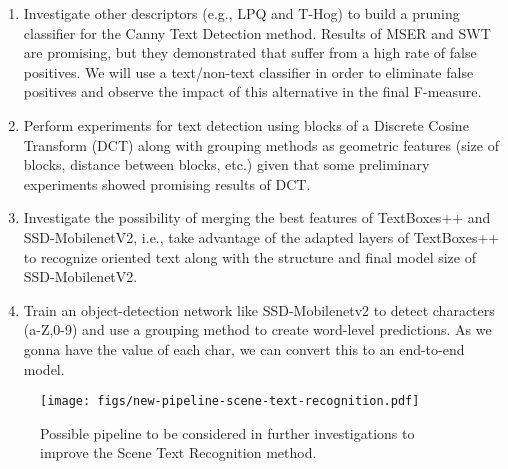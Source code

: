 \begin{enumerate}
    \item Investigate other descriptors (e.g., LPQ and T-Hog) to build a pruning classifier for the Canny Text Detection method. Results of MSER and SWT are promising, but they demonstrated that suffer from a high rate of false positives. We will use a text/non-text classifier in order to eliminate false positives and observe the impact of this alternative in the final F-measure.
    
    \item Perform experiments for text detection using blocks of a Discrete Cosine Transform (DCT) along with grouping methods as geometric features (size of blocks, distance between blocks, etc.) given that some preliminary experiments showed promising results of DCT.
    
    \item Investigate the possibility of merging the best features of TextBoxes++ and SSD-MobilenetV2, i.e., take advantage of the adapted layers of TextBoxes++ to recognize oriented text along with the structure and final model size of SSD-MobilenetV2.
    
    \item Train an object-detection network like SSD-Mobilenetv2 to detect characters (a-Z,0-9) and use a grouping method to create word-level predictions. As we gonna have the value of each char, we can convert this to an end-to-end model.
\end{enumerate}
%
\begin{figure}[H]
    \centering
    \texttt{[image: figs/new-pipeline-scene-text-recognition.pdf]}
    \caption{Possible pipeline to be considered in further investigations to improve the Scene Text Recognition method.}
    \label{fig:new_pipeline}
\end{figure}
